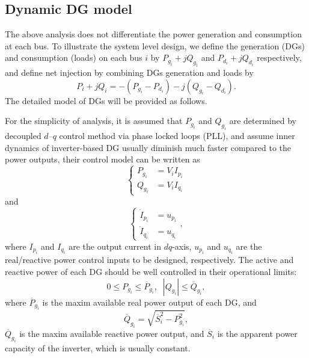 \documentclass{article}
\begin{document}
\subsection{Dynamic DG model}
The above analysis does not differentiate the power generation and consumption at each bus. To illustrate the system level design, we define the generation (DGs) and consumption (loads) on each bus $i$ by $P_{g_i} + j Q_{g_i}$ and $P_{d_i} + j Q_{d_i}$ respectively, and define net injection by combining DGs generation and loads by
\begin{equation}
P_i + j Q_i =- (P_{g_i} -P_{d_i})- j (Q_{g_i}- Q_{d_i}).
\end{equation}
The detailed model of DGs will be provided as follows. 

For the simplicity of analysis, it is assumed that $P_{g_i}$ and $Q_{g_i}$ are determined by decoupled $d–q$ control method via phase locked loops (PLL), and assume inner dynamics of inverter-based DG usually diminish much faster compared to the power outputs, their control model \cite{xin2011co} can be written as
 \begin{equation}
     \left\{
     \begin{array}{cc}
          P_{g_i} &= V_i I_{p_i}   \\
          Q_{g_i} &= V_i I_{q_i} 
     \end{array}
     \right.\label{eq:dgmdl}
\end{equation} 
and
\begin{equation}
     \left\{\begin{array}{cc}
          \dot I_{p_i} &= u_{p_i}  \\
          \dot I_{q_i} &= u_{q_i}
     \end{array},\right.\label{eq:dgui}
\end{equation}
where $I_{p_i}$ and $I_{q_i}$ are the output current in $dq$-axis, $u_{p_i}$ and $u_{q_i}$ are the real/reactive power control inputs to be designed, respectively. The active and reactive power of each DG should be well controlled in their operational limits:
\begin{equation*}
    0\leq P_{g_i} \leq \overline{P}_{g_i},\;\;|Q_{g_i}| \leq \overline{Q}_{g_i},
\end{equation*}
where $\overline{P}_{g_i}$ is the maxim available real power output of each DG, and
\begin{equation}
\overline{Q}_{g_i} = \sqrt{\overline{S}_{i}^2-P_{g_i}^2},    \label{eq:qbar}
\end{equation}
$\overline{Q}_{g_i}$ is the maxim available reactive power output, and $\overline{S}_{i}$ is the apparent power capacity of the inverter, which is usually constant.
\end{document}
